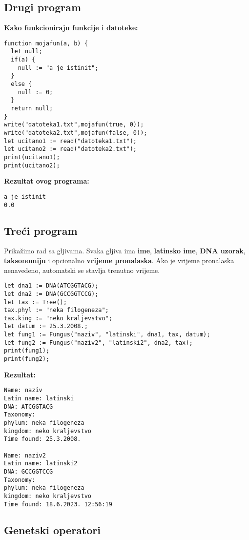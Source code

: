 \documentclass[12pt]{scrartcl}
\begin{document}
\subsection{Drugi program}
\textbf{Kako funkcioniraju funkcije i datoteke:}
\begin{lstlisting}
function mojafun(a, b) {
  let null;
  if(a) {
    null := "a je istinit";
  }
  else {
    null := 0;
  }
  return null;
}
write("datoteka1.txt",mojafun(true, 0));
write("datoteka2.txt",mojafun(false, 0));
let ucitano1 := read("datoteka1.txt");
let ucitano2 := read("datoteka2.txt");
print(ucitano1);
print(ucitano2);
\end{lstlisting}
\textbf{Rezultat ovog programa:}
\begin{lstlisting}
a je istinit
0.0
\end{lstlisting}
\subsection{Treći program}
Prikažimo rad sa gljivama. Svaka gljiva ima \textbf{ime}, \textbf{latinsko ime}, \textbf{DNA uzorak}, \textbf{taksonomiju} i opcionalno
\textbf{vrijeme pronalaska}. Ako je vrijeme pronalaska nenavedeno, automatski se stavlja trenutno vrijeme.
\begin{lstlisting}
let dna1 := DNA(ATCGGTACG);
let dna2 := DNA(GCCGGTCCG);
let tax := Tree();
tax.phyl := "neka filogeneza";
tax.king := "neko kraljevstvo";
let datum := 25.3.2008.;
let fung1 := Fungus("naziv", "latinski", dna1, tax, datum);
let fung2 := Fungus("naziv2", "latinski2", dna2, tax);
print(fung1);
print(fung2);
\end{lstlisting}
\textbf{Rezultat:}
\begin{lstlisting}
Name: naziv
Latin name: latinski
DNA: ATCGGTACG
Taxonomy: 
phylum: neka filogeneza
kingdom: neko kraljevstvo
Time found: 25.3.2008.

Name: naziv2
Latin name: latinski2
DNA: GCCGGTCCG
Taxonomy: 
phylum: neka filogeneza
kingdom: neko kraljevstvo
Time found: 18.6.2023. 12:56:19

\end{lstlisting}
\subsection{Genetski operatori}
\end{document}
